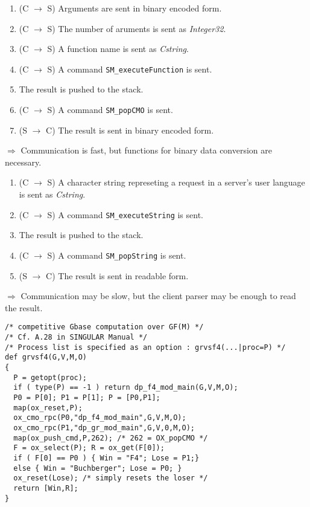 \begin{slide}{}

\begin{enumerate}
\item (C $\rightarrow$ S) Arguments are sent in binary encoded form.
\item (C $\rightarrow$ S) The number of aruments is sent as {\sl Integer32}.
\item (C $\rightarrow$ S) A function name is sent as {\sl Cstring}.
\item (C $\rightarrow$ S) A command {\tt SM\_executeFunction} is sent.
\item The result is pushed to the stack.
\item (C $\rightarrow$ S) A command {\tt SM\_popCMO} is sent.
\item (S $\rightarrow$ C) The result is sent in binary encoded form.
\end{enumerate}

$\Rightarrow$ Communication is fast, but functions for binary data
conversion are necessary.
\end{slide}

\begin{slide}{}

\begin{enumerate}
\item (C $\rightarrow$ S) A character string represeting a request in a server's
user language is sent as {\sl Cstring}.
\item (C $\rightarrow$ S) A command {\tt SM\_executeString} is sent.
\item The result is pushed to the stack.
\item (C $\rightarrow$ S) A command {\tt SM\_popString} is sent.
\item (S $\rightarrow$ C) The result is sent in readable form.
\end{enumerate}

$\Rightarrow$ Communication may be slow, but the client parser may be
enough to read the result.
\end{slide}

\begin{slide}{}

\begin{verbatim}
/* competitive Gbase computation over GF(M) */
/* Cf. A.28 in SINGULAR Manual */
/* Process list is specified as an option : grvsf4(...|proc=P) */
def grvsf4(G,V,M,O)
{
  P = getopt(proc);
  if ( type(P) == -1 ) return dp_f4_mod_main(G,V,M,O);
  P0 = P[0]; P1 = P[1]; P = [P0,P1];
  map(ox_reset,P);
  ox_cmo_rpc(P0,"dp_f4_mod_main",G,V,M,O);
  ox_cmo_rpc(P1,"dp_gr_mod_main",G,V,0,M,O);
  map(ox_push_cmd,P,262); /* 262 = OX_popCMO */
  F = ox_select(P); R = ox_get(F[0]);
  if ( F[0] == P0 ) { Win = "F4"; Lose = P1;}
  else { Win = "Buchberger"; Lose = P0; }
  ox_reset(Lose); /* simply resets the loser */
  return [Win,R];
}
\end{verbatim}

\end{slide}

